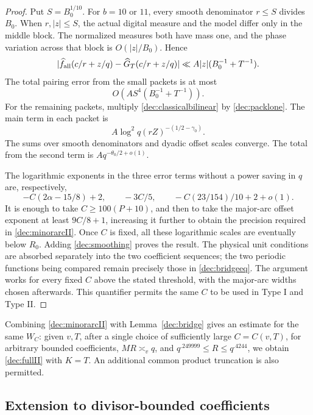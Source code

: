 \documentclass[11pt,a4paper]{article}
\theoremstyle{paperplain}
\numberwithin{equation}{section}
\begin{document}
\begin{proof}
Put $S=B_0^{1/10}$.
For $b=10$ or $11$, every smooth denominator $r\le S$ divides $B_0$.
When $r,|z|\le S$, the actual digital measure and the model differ only
in the middle block. The normalized measures both have mass one, and the phase
variation across that block is $O(|z|/B_0)$. Hence
\[
 |\widehat f_{\rm all}(c/r+z/q)-\widehat G_T(c/r+z/q)|
 \ll A|z|(B_0^{-1}+T^{-1}).
\]
The total pairing error from the small packets is at most
\[
 O(AS^4(B_0^{-1}+T^{-1})).
\]
For the remaining packets, multiply \eqref{dec:classicalbilinear}
by \eqref{dec:packlone}. The main term in each packet is
\[
 A\log^2q(rZ)^{-(1/2-\gamma_0)}.
\]
The sums over smooth denominators and dyadic offset scales converge.
The total from the second term is $Aq^{-\theta_0/2+o(1)}$.

The logarithmic exponents in the three error terms without a power
saving in $q$ are, respectively,
\[
 -C(2\alpha-15/8)+2,\qquad -3C/5,\qquad
 -C(23/154)/10+2+o(1).
\]
It is enough to take $C\ge100(P+10)$, and then to take the
major-arc offset exponent at least $9C/8+1$, increasing it further
to obtain the precision required in \eqref{dec:minorarcII}.
Once $C$ is fixed, all these logarithmic scales are eventually below
$R_0$. Adding \eqref{dec:smoothing} proves the result.
The physical unit conditions are absorbed separately into the two
coefficient sequences; the two periodic functions being compared
remain precisely those in \eqref{dec:bridgeeq}.
The argument works for every fixed $C$ above the stated threshold,
with the major-arc widths chosen afterwards. This quantifier permits
the same $C$ to be used in Type I and Type II.
\end{proof}

Combining \eqref{dec:minorarcII} with Lemma~\ref{dec:bridge} gives
an estimate for the same $W_C$:
given $v,T$, after a single choice of sufficiently large $C=C(v,T)$,
for arbitrary bounded coefficients, $MR\asymp_vq$, and
$q^{.249999}\le R\le q^{.4244}$, we obtain \eqref{dec:fullII}
with $K=T$.
An additional common product truncation is also permitted.

\subsection{Extension to divisor-bounded coefficients}
\end{document}
